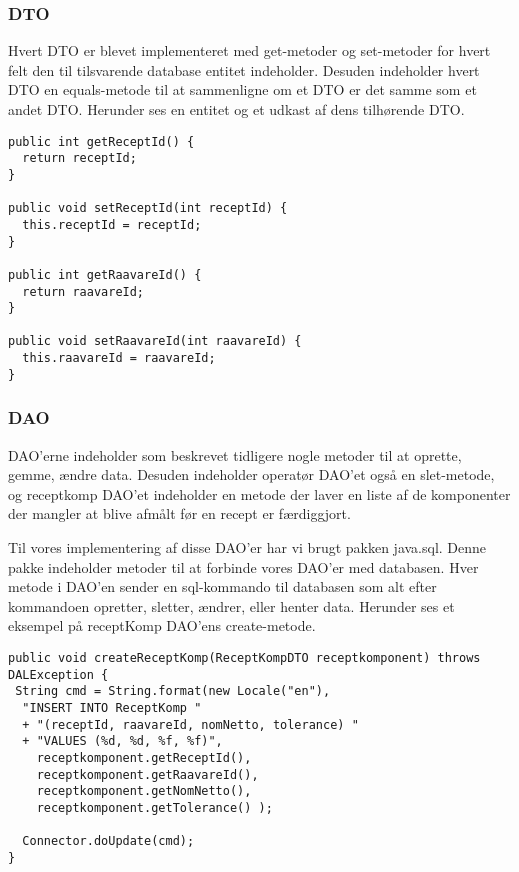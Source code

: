\documentclass[a4paper]{article}
\begin{document}
\subsubsection{DTO} %

Hvert DTO er blevet implementeret med get-metoder og set-metoder for hvert felt den til tilsvarende database entitet indeholder. Desuden indeholder hvert DTO en equals-metode til at sammenligne om et DTO er det samme som et andet DTO. Herunder ses en entitet og et udkast af dens tilhørende DTO.

\begin{lstlisting}
public int getReceptId() {
  return receptId;
}

public void setReceptId(int receptId) {
  this.receptId = receptId;
}

public int getRaavareId() {
  return raavareId;
}

public void setRaavareId(int raavareId) {
  this.raavareId = raavareId;
}
\end{lstlisting}


\subsubsection{DAO} %

DAO’erne indeholder som beskrevet tidligere nogle metoder til at oprette, gemme, ændre data. Desuden indeholder operatør DAO’et også en slet-metode, og receptkomp DAO’et indeholder en metode der laver en liste af de komponenter der mangler at blive afmålt før en recept er færdiggjort.

Til vores implementering af disse DAO’er har vi brugt pakken java.sql. Denne pakke indeholder metoder til at forbinde vores DAO’er med databasen. Hver metode i DAO’en sender en sql-kommando til databasen som alt efter kommandoen opretter, sletter, ændrer, eller henter data. Herunder ses et eksempel på receptKomp DAO’ens create-metode.

\begin{lstlisting}
public void createReceptKomp(ReceptKompDTO receptkomponent) throws DALException {
 String cmd = String.format(new Locale("en"),
  "INSERT INTO ReceptKomp " 
  + "(receptId, raavareId, nomNetto, tolerance) "
  + "VALUES (%d, %d, %f, %f)",
    receptkomponent.getReceptId(),
    receptkomponent.getRaavareId(),
    receptkomponent.getNomNetto(),
    receptkomponent.getTolerance() );

  Connector.doUpdate(cmd);
}
\end{lstlisting}
\end{document}
